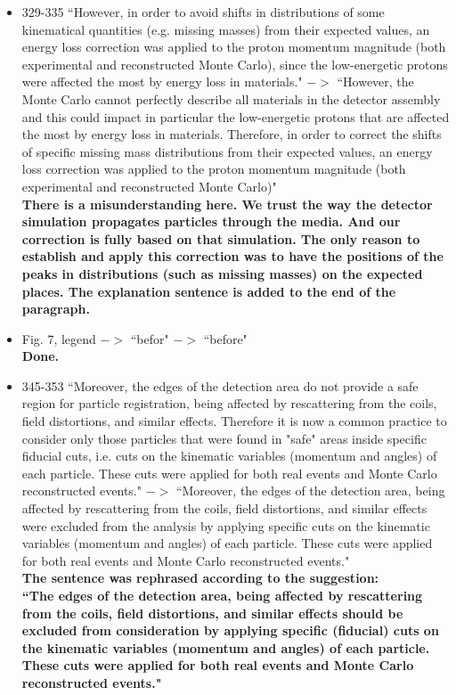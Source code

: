 \documentclass[,superscriptaddress,showpacs,amssymb,amsmath,amsfonts,linenumbers,article]{revtex4-1}
\begin{document}
\begin{itemize}
\item 329-335 ``However, in order to avoid shifts in distributions of some kinematical quantities (e.g. missing masses) from their expected values, an energy loss correction was applied to the proton momentum magnitude (both experimental and reconstructed Monte Carlo), since the low-energetic protons were affected the most by energy loss in materials." $->$ ``However, the Monte Carlo cannot perfectly describe all materials in the detector assembly and this could impact in particular the low-energetic protons that are affected the most by energy loss in materials. Therefore, in order to correct the shifts of specific missing mass distributions from their expected values, an energy loss correction was applied to the proton momentum magnitude (both experimental and reconstructed Monte Carlo)"\\

{\bf There is a misunderstanding here. We trust the way the detector simulation propagates particles through the media. And our correction is fully based on that simulation. The only reason to establish and apply this correction was to have the positions of the peaks in distributions (such as missing masses) on the expected places. The explanation sentence is added to the end of the paragraph.}

\item Fig. 7, legend $->$ ``befor" $->$ ``before"\\
{\bf Done.}

\item 345-353 ``Moreover, the edges of the detection area do not provide a safe region for particle registration, being affected by rescattering from the coils, field distortions, and similar effects. Therefore it is now a common practice to consider only those particles that were found in "safe" areas inside specific fiducial cuts, i.e. cuts on the kinematic variables (momentum and angles) of each particle. These cuts were applied for both real events and Monte Carlo reconstructed events." $->$ ``Moreover, the edges of the detection area, being affected by rescattering from the coils, field distortions, and similar effects were excluded from the analysis by applying specific cuts on the kinematic variables (momentum and angles) of each particle. These cuts were applied for both real events and Monte Carlo reconstructed events."\\
{\bf The sentence was rephrased according to the suggestion:\\
\textbf{{``The edges of the detection area, being affected by rescattering from the
coils, field distortions, and similar effects should be excluded from consideration by applying specific (fiducial) cuts on the kinematic variables
(momentum and angles) of each particle. These cuts were applied for both real events and Monte Carlo reconstructed events."}} }


\end{itemize}
\end{document}
